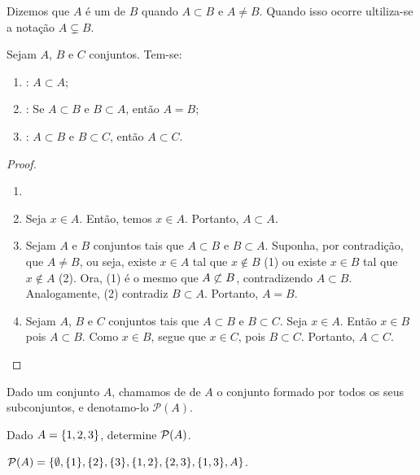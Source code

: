 \begin{definition}
Dizemos que $A$ é um  de $B$ quando $A \subset B$ e $A \neq B$. Quando isso ocorre ultiliza-se a notação $A \subsetneq B$.
\end{definition}

\begin{proposition}
Sejam $A$, $B$ e $C$ conjuntos. Tem-se:
%
\begin{enumerate}
\item {}: $A \subset A$;
\item {}: Se $A \subset B$ e $B \subset A$, então $A = B$;
\item {}: $A \subset B$ e $B \subset C$, então $A \subset C$.
\end{enumerate}
\end{proposition}

\begin{proof}
\begin{enumerate}
	\item[] 
	\item Seja $x \in A$. Então, temos $x \in A$. Portanto, $A \subset A$.
	\item Sejam $A$ e $B$ conjuntos tais que $A \subset B$ e $B \subset A$. Suponha, por contradição, que $A \ne B$, ou seja, existe $x \in A$ tal que $x \notin B$ (1) ou existe $x \in B$ tal que $x \notin A$ (2). Ora, (1) é o mesmo que $A \not\subset B$, contradizendo $A \subset B$. Analogamente, (2) contradiz $B \subset A$. Portanto, $A = B$.
	\item Sejam $A$, $B$ e $C$ conjuntos tais que $A \subset B$ e $B \subset C$. Seja $x \in A$. Então $x \in B$ pois $A \subset B$. Como $x \in B$, segue que $x \in C$, pois $B \subset C$. Portanto, $A \subset C$.
\end{enumerate}
\end{proof}

\begin{definition}
Dado um conjunto $A$, chamamos de  de $A$ o conjunto formado por todos os seus subconjuntos, e denotamo-lo $\mathcal{P}(A)$.
\end{definition}

\begin{example}
Dado $A = \left\{1,2,3\right\}$, determine $\mathcal{P}(A)$.
\end{example}

\begin{solution}
$\mathcal{P}(A)=\{\emptyset,\{1\}, \{2\}, \{3\}, \{1,2\}, \{2,3\}, \{1,3\},A\}$.
\end{solution}
